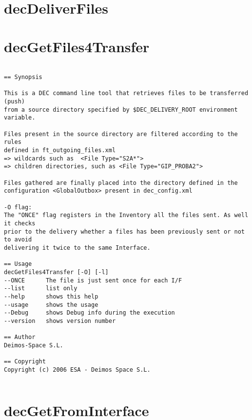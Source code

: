 \documentclass[dec_sum_main.tex]{subfiles}
\begin{document}
\section{decDeliverFiles}


\label{decGetFiles4Transfer}
\section{decGetFiles4Transfer}

\begin{verbatim}

== Synopsis

This is a DEC command line tool that retrieves files to be transferred (push)
from a source directory specified by $DEC_DELIVERY_ROOT environment variable.

Files present in the source directory are filtered according to the rules 
defined in ft_outgoing_files.xml
=> wildcards such as  <File Type="S2A*">
=> children directories, such as <File Type="GIP_PROBA2"> 

Files gathered are finally placed into the directory defined in the 
configuration <GlobalOutbox> present in dec_config.xml 

-O flag:
The "ONCE" flag registers in the Inventory all the files sent. As well it checks
prior to the delivery whether a files has been previously sent or not to avoid 
delivering it twice to the same Interface.

== Usage
decGetFiles4Transfer [-O] [-l]
--ONCE      The file is just sent once for each I/F
--list      list only
--help      shows this help
--usage     shows the usage
--Debug     shows Debug info during the execution
--version   shows version number

== Author
Deimos-Space S.L.

== Copyright
Copyright (c) 2006 ESA - Deimos Space S.L.


\end{verbatim}

\section{decGetFromInterface}
\end{document}
